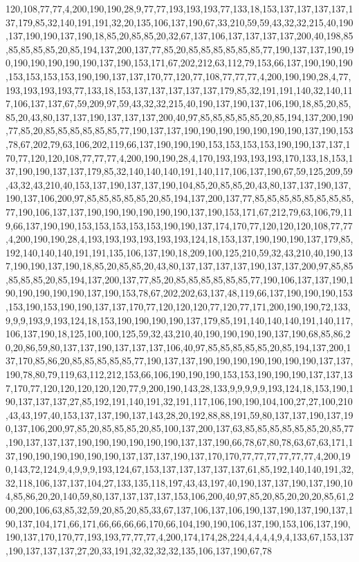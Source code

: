 120,108,77,77,4,200,190,190,28,9,77,77,193,193,193,77,133,18,153,137,137,137,137,137,179,85,32,140,191,191,32,20,135,106,137,190,67,33,210,59,59,43,32,32,215,40,190,137,190,190,137,190,18,85,20,85,85,20,32,67,137,106,137,137,137,137,200,40,198,85,85,85,85,85,20,85,194,137,200,137,77,85,20,85,85,85,85,85,85,77,190,137,137,190,190,190,190,190,190,190,137,190,153,171,67,202,212,63,112,79,153,66,137,190,190,190,153,153,153,153,190,190,137,137,170,77,120,77,108,77,77,77,4,200,190,190,28,4,77,193,193,193,193,77,133,18,153,137,137,137,137,137,179,85,32,191,191,140,32,140,117,106,137,137,67,59,209,97,59,43,32,32,215,40,190,137,190,137,106,190,18,85,20,85,85,20,43,80,137,137,190,137,137,137,200,40,97,85,85,85,85,85,20,85,194,137,200,190,77,85,20,85,85,85,85,85,85,77,190,137,137,190,190,190,190,190,190,190,137,190,153,78,67,202,79,63,106,202,119,66,137,190,190,190,153,153,153,153,190,190,137,137,170,77,120,120,108,77,77,77,4,200,190,190,28,4,170,193,193,193,193,170,133,18,153,137,190,190,137,137,179,85,32,140,140,140,191,140,117,106,137,190,67,59,125,209,59,43,32,43,210,40,153,137,190,137,137,190,104,85,20,85,85,20,43,80,137,137,190,137,190,137,106,200,97,85,85,85,85,85,20,85,194,137,200,137,77,85,85,85,85,85,85,85,85,77,190,106,137,137,190,190,190,190,190,190,137,190,153,171,67,212,79,63,106,79,119,66,137,190,190,153,153,153,153,153,190,190,137,174,170,77,120,120,120,108,77,77,4,200,190,190,28,4,193,193,193,193,193,193,124,18,153,137,190,190,190,137,179,85,192,140,140,140,191,191,135,106,137,190,18,209,100,125,210,59,32,43,210,40,190,137,190,190,137,190,18,85,20,85,85,20,43,80,137,137,137,137,190,137,137,200,97,85,85,85,85,85,20,85,194,137,200,137,77,85,20,85,85,85,85,85,85,77,190,106,137,137,190,190,190,190,190,190,137,190,153,78,67,202,202,63,137,48,119,66,137,190,190,190,153,153,190,153,190,190,137,137,170,77,120,120,120,77,120,77,171,200,190,190,72,133,9,9,9,193,9,193,124,18,153,190,190,190,190,137,179,85,191,140,140,140,191,140,117,106,137,190,18,125,100,100,125,59,32,43,210,40,190,190,190,190,137,190,68,85,86,20,20,86,59,80,137,137,190,137,137,137,106,40,97,85,85,85,85,85,20,85,194,137,200,137,170,85,86,20,85,85,85,85,85,77,190,137,137,190,190,190,190,190,190,190,137,137,190,78,80,79,119,63,112,212,153,66,106,190,190,190,153,153,190,190,190,137,137,137,170,77,120,120,120,120,120,77,9,200,190,143,28,133,9,9,9,9,9,193,124,18,153,190,190,137,137,137,27,85,192,191,140,191,32,191,117,106,190,190,104,100,27,27,100,210,43,43,197,40,153,137,137,190,137,143,28,20,192,88,88,191,59,80,137,137,190,137,190,137,106,200,97,85,20,85,85,85,20,85,100,137,200,137,63,85,85,85,85,85,85,20,85,77,190,137,137,137,190,190,190,190,190,190,137,137,190,66,78,67,80,78,63,67,63,171,137,190,190,190,190,190,190,137,137,137,190,137,170,170,77,77,77,77,77,77,4,200,190,143,72,124,9,4,9,9,9,193,124,67,153,137,137,137,137,137,61,85,192,140,140,191,32,32,118,106,137,137,104,27,133,135,118,197,43,43,197,40,190,137,137,190,137,190,104,85,86,20,20,140,59,80,137,137,137,137,153,106,200,40,97,85,20,85,20,20,20,85,61,200,200,106,63,85,32,59,20,85,20,85,33,67,137,106,137,106,190,137,190,137,190,137,190,137,104,171,66,171,66,66,66,66,170,66,104,190,190,106,137,190,153,106,137,190,190,137,170,170,77,193,193,77,77,77,4,200,174,174,28,224,4,4,4,4,9,4,133,67,153,137,190,137,137,137,27,20,33,191,32,32,32,32,135,106,137,190,67,78